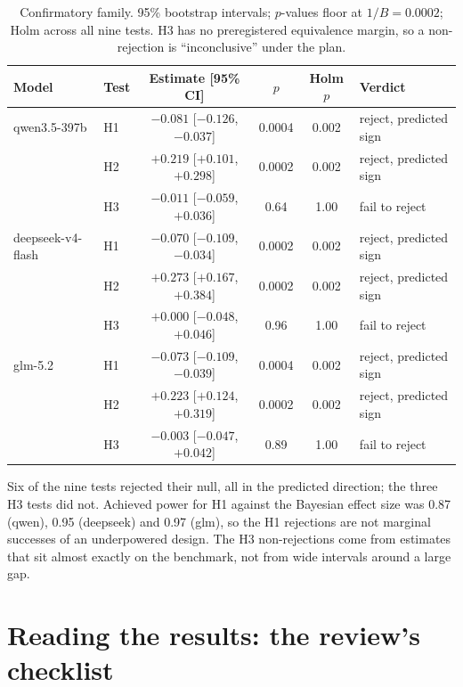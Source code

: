 \documentclass[11pt,a4paper]{article}
\begin{document}
\begin{table}[h]
\centering\small
\caption{Confirmatory family. 95\% bootstrap intervals; $p$-values floor at $1/B=0.0002$; Holm across all nine tests. H3 has no preregistered equivalence margin, so a non-rejection is ``inconclusive'' under the plan.}
\label{tab:family}
\begin{tabular}{llcccl}
\toprule
Model & Test & Estimate [95\% CI] & $p$ & Holm $p$ & Verdict \\
\midrule
qwen3.5-397b & H1 & $-0.081$ [$-0.126$, $-0.037$] & 0.0004 & 0.002 & reject, predicted sign \\
 & H2 & $+0.219$ [$+0.101$, $+0.298$] & 0.0002 & 0.002 & reject, predicted sign \\
 & H3 & $-0.011$ [$-0.059$, $+0.036$] & 0.64 & 1.00 & fail to reject \\
\addlinespace
deepseek-v4-flash & H1 & $-0.070$ [$-0.109$, $-0.034$] & 0.0002 & 0.002 & reject, predicted sign \\
 & H2 & $+0.273$ [$+0.167$, $+0.384$] & 0.0002 & 0.002 & reject, predicted sign \\
 & H3 & $+0.000$ [$-0.048$, $+0.046$] & 0.96 & 1.00 & fail to reject \\
\addlinespace
glm-5.2 & H1 & $-0.073$ [$-0.109$, $-0.039$] & 0.0004 & 0.002 & reject, predicted sign \\
 & H2 & $+0.223$ [$+0.124$, $+0.319$] & 0.0002 & 0.002 & reject, predicted sign \\
 & H3 & $-0.003$ [$-0.047$, $+0.042$] & 0.89 & 1.00 & fail to reject \\
\bottomrule
\end{tabular}
\end{table}

Six of the nine tests rejected their null, all in the predicted direction; the three H3 tests did not. Achieved power for H1 against the Bayesian effect size was 0.87 (qwen), 0.95 (deepseek) and 0.97 (glm), so the H1 rejections are not marginal successes of an underpowered design. The H3 non-rejections come from estimates that sit almost exactly on the benchmark, not from wide intervals around a large gap.

\section{Reading the results: the review's checklist}
\end{document}
